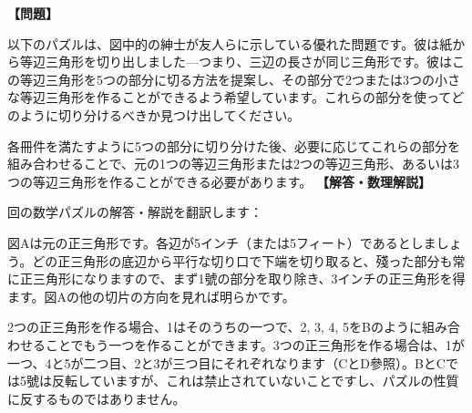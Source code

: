 \documentclass[10pt,a4paper,oneside,openany]{ltjsbook}
\begin{document}
\begin{tcolorbox}[colback=softblue,colframe=primaryblue,title=\textbf{第 156 問：THE DISSECTED TRIANGLE.},arc=2mm,boxrule=1pt,breakable]
\textbf{【問題】}\par\vspace{0.3em}
以下のパズルは、図中的の紳士が友人らに示している優れた問題です。彼は紙から等辺三角形を切り出しました—つまり、三辺の長さが同じ三角形です。彼はこの等辺三角形を5つの部分に切る方法を提案し、その部分で2つまたは3つの小さな等辺三角形を作ることができるよう希望しています。これらの部分を使ってどのように切り分けるべきか見つけ出してください。

各冊件を満たすように5つの部分に切り分けた後、必要に応じてこれらの部分を組み合わせることで、元の1つの等辺三角形または2つの等辺三角形、あるいは3つの等辺三角形を作ることができる必要があります。
\tcblower
\textbf{【解答・数理解説】}\par\vspace{0.3em}
回の数学パズルの解答・解説を翻訳します：

図Aは元の正三角形です。各辺が5インチ（または5フィート）であるとしましょう。どの正三角形の底辺から平行な切り口で下端を切り取ると、殘った部分も常に正三角形になりますので、まず1號の部分を取り除き、3インチの正三角形を得ます。図Aの他の切片の方向を見れば明らかです。

2つの正三角形を作る場合、1はそのうちの一つで、2, 3, 4, 5をBのように組み合わせることでもう一つを作ることができます。3つの正三角形を作る場合は、1が一つ、4と5が二つ目、2と3が三つ目にそれぞれなります（CとD參照）。BとCでは5號は反転していますが、これは禁止されていないことですし、パズルの性質に反するものではありません。
\end{tcolorbox}
\end{document}
